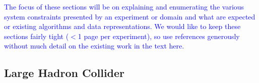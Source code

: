 \noindent 
\textcolor{blue}{
The focus of these sections will be on explaining and  enumerating the various system constraints presented by an experiment or domain and what are expected or existing algorithms and data representations.  We would like to keep these sections fairly tight ($<$1 page per experiment), so use references generously without much detail on the existing work in the text here.  
}




\subsection{Large Hadron Collider}

